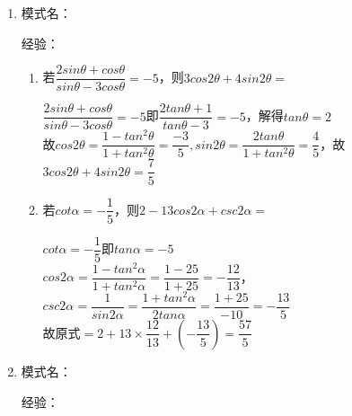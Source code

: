 \begin{enumerate}
\begin{enumerate}
\begin{jieda}
            根据和角公式有$tan(\alpha + \beta) = \dfrac{tan\alpha + tan\beta}{1 - tan\alpha \cdot tan\beta} = \dfrac{4}{3}$，故$cos(\alpha+\beta) = -\dfrac{3}{5}, sin(\alpha + \beta) = -\dfrac{4}{5}$，故$tan\left(\dfrac{\alpha+\beta}{2}\right) = \dfrac{sin(\alpha+\beta)}{1+cos(\alpha + \beta)} = -2$. \\
            \ps 判别式大于零影响$a$的范围，但是对于本题$tan(\alpha + \beta)$的值不含$a$，所以对解题没影响.
        \end{jieda}
    \end{enumerate}
    \item 
    模式名：

    经验：
    \begin{enumerate}
        \item 若$\dfrac{2sin\theta + cos\theta}{sin\theta - 3cos\theta} = -5$，则$3cos2\theta + 4sin2\theta = $
        \begin{jieda}
            $\dfrac{2sin\theta + cos\theta}{sin\theta - 3cos\theta} = -5$即$\dfrac{2tan\theta + 1}{tan\theta - 3} = -5$，解得$tan\theta = 2$ \\
            故$cos2\theta = \dfrac{1-tan^2\theta}{1+tan^2\theta} = \dfrac{-3}{5}, sin2\theta = \dfrac{2tan\theta}{1+tan^2\theta} = \dfrac{4}{5}$，故$3cos2\theta + 4sin2\theta = \dfrac{7}{5}$
        \end{jieda}
        \item 若$cot\alpha = -\dfrac{1}{5}$，则$2 - 13cos2\alpha + csc2\alpha = $
        \begin{jieda}
            $cot\alpha = -\dfrac{1}{5}$即$tan\alpha = -5$ \\
            $cos2\alpha = \dfrac{1-tan^2\alpha}{1+tan^2\alpha} = \dfrac{1-25}{1+25} = -\dfrac{12}{13}$，$csc2\alpha = \dfrac{1}{sin2\alpha} = \dfrac{1+tan^2\alpha}{2tan\alpha} = \dfrac{1+25}{-10} = -\dfrac{13}{5}$ \\
            故原式$ = 2 + 13 \times \dfrac{12}{13} + (-\dfrac{13}{5}) = \dfrac{57}{5}$
        \end{jieda}
    \end{enumerate}
    \item
    模式名：

    经验：


\end{enumerate}

